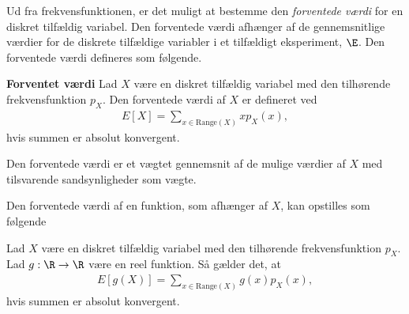 


Ud fra frekvensfunktionen, er det muligt at bestemme den \textit{forventede værdi} for en diskret tilfældig variabel. Den forventede værdi afhænger af de gennemsnitlige værdier for de diskrete tilfældige variabler i et tilfældigt eksperiment, $\E$. Den forventede værdi defineres som følgende.

\begin{minipage}\textwidth
\begin{defn}\textbf{Forventet værdi} \label{def:Forventetværdi} %
\newline
Lad $X$ være en diskret tilfældig variabel med den tilhørende frekvensfunktion $p_X$. Den forventede værdi af $X$ er defineret ved
\begin{align}
E[X]=\sum_{x\in \text{Range}(X)} x p_X(x),
\end{align}
hvis summen er absolut konvergent.
\end{defn}
\end{minipage}

Den forventede værdi er et vægtet gennemsnit af de mulige værdier af $X$ med tilsvarende sandsynligheder som vægte. 

Den forventede værdi af en funktion, som afhænger af $X$, kan opstilles som følgende

\begin{minipage}\textwidth
\begin{pro} \textbf{} \label{prop:forventet_værdi_af_funktion} %
\newline
Lad $X$ være en diskret tilfældig variabel med den tilhørende frekvensfunktion $p_X$. Lad $g: \R \to \R$ være en reel funktion. Så gælder det, at
\begin{align}           
    E\left[g(X)\right]=\sum_{x \in \text{Range}(X)} g(x)p_X(x),
\end{align}
hvis summen er absolut konvergent.
\end{pro}
\end{minipage}

